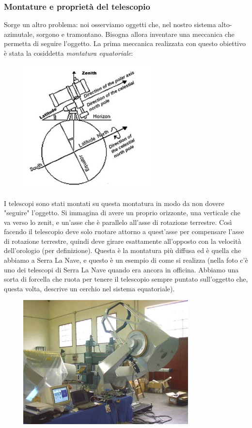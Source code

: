 \subsubsection{Montature e proprietà del telescopio}
Sorge un altro problema: noi osserviamo oggetti che, nel nostro sistema alto-azimutale, sorgono e tramontano. Bisogna allora inventare una meccanica che permetta di seguire l'oggetto. La prima meccanica realizzata con questo obiettivo è stata la cosiddetta \textit{montatura equatoriale}:

\begin{figure}[H]
        \centering
        \includegraphics[width=7cm]{8.jpg}
\end{figure}

I telescopi sono stati montati su questa montatura in modo da non dovere "seguire" l'oggetto. Si immagina di avere un proprio orizzonte, una verticale che va verso lo zenit, e un'asse che è parallelo all'asse di rotazione terrestre. Così facendo il telescopio deve solo ruotare attorno a quest'asse per compensare l'asse di rotazione terrestre, quindi deve girare esattamente all'opposto con la velocità dell'orologio (per definizione). Questa è la montatura più diffusa ed è quella che abbiamo a Serra La Nave, e questo è un esempio di come si realizza (nella foto c'è uno dei telescopi di Serra La Nave quando era ancora in officina. Abbiamo una sorta di forcella che ruota per tenere il telescopio sempre puntato sull'oggetto che, questa volta, descrive un cerchio nel sistema equatoriale).

\begin{figure}[H]
        \centering
        \includegraphics[width=9cm]{9.jpg}
\end{figure}

